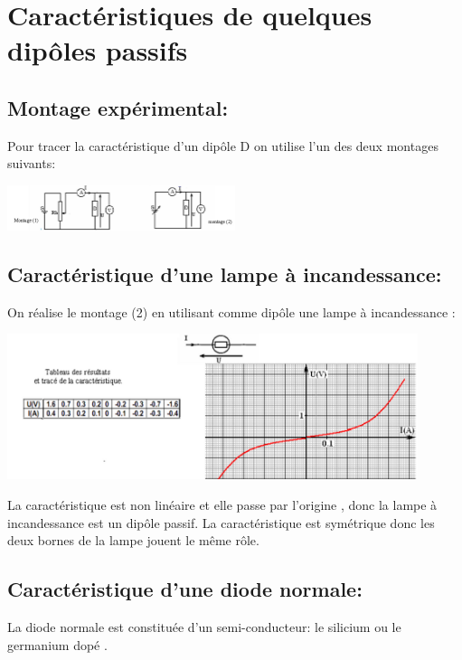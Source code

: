 \documentclass[12pt]{article}
\begin{document}
\section{Caractéristiques de quelques dipôles passifs }
\subsection{ Montage expérimental:}
Pour tracer la caractéristique d'un dipôle D on utilise l'un des deux montages suivants:


\begin{center}
\includegraphics[width=0.5\textwidth]{./img/Tension_exper.png}
\end{center}
\subsection{Caractéristique d'une lampe à incandessance:}
On réalise le montage (2) en utilisant comme dipôle une lampe à incandessance :

\begin{center}
  \includegraphics[width=0.9\textwidth]{./img/lampe_U.png}
\end{center}

\begin{tcolorbox}{}
La caractéristique est non linéaire et elle passe par l'origine , donc la lampe à incandessance est un dipôle passif.
La caractéristique est symétrique donc les deux bornes de la lampe jouent le même rôle.
\end{tcolorbox}

\subsection{Caractéristique d'une diode normale: }
La diode normale est constituée d'un semi-conducteur: le silicium ou le germanium dopé .
\end{document}
